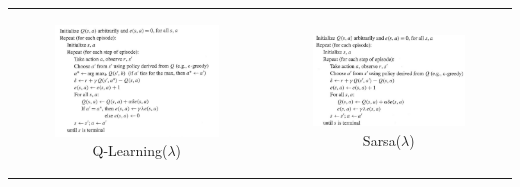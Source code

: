 \documentclass[a4paper,12pt]{article}
\begin{document}
        \begin{center}
	\begin{tabular}{cc}
	  \hspace*{-1cm}
	  \begin{minipage}[b]{.52\linewidth}
	    \begin{figure}[H]
	      \includegraphics[width=270px]{QLearning_Lamb}
	      \caption{ Q-Learning($\lambda$)  }
	    \end{figure}
	  \end{minipage}
	  &
	  \begin{minipage}[b]{.5\linewidth}
	    \begin{figure}[H]
	      \includegraphics[width=270px]{Sarsa_lamb}
	      \caption{ Sarsa($\lambda$)  }
	    \end{figure}
	  \end{minipage}
	\end{tabular}
      \end{center} 
      
\end{document}
